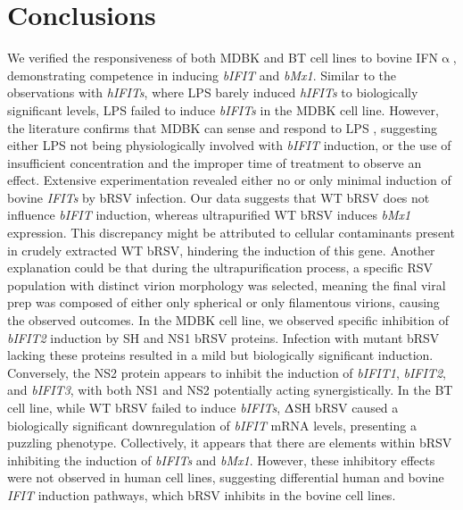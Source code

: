 \section{Conclusions} \label{sec:Conclusions Chapter2}
We verified the responsiveness of both MDBK and BT cell lines to bovine IFN$\upalpha$, demonstrating competence in inducing \textit{bIFIT} and \textit{bMx1}. Similar to the observations with \textit{hIFITs}, where LPS barely induced \textit{hIFITs} to biologically significant levels, LPS failed to induce \textit{bIFITs} in the MDBK cell line. However, the literature confirms that MDBK can sense and respond to LPS \cite{Cui2022ThePathway}, suggesting either LPS not being physiologically involved with \textit{bIFIT} induction, or the use of insufficient concentration and the improper time of treatment to observe an effect. Extensive experimentation revealed either no or only minimal induction of bovine \textit{IFITs} by bRSV infection. Our data suggests that WT bRSV does not influence \textit{bIFIT} induction, whereas ultrapurified WT bRSV induces \textit{bMx1} expression. This discrepancy might be attributed to cellular contaminants present in crudely extracted WT bRSV, hindering the induction of this gene. Another explanation could be that during the ultrapurification process, a specific RSV population with distinct virion morphology was selected, meaning the final viral prep was composed of either only spherical or only filamentous virions, causing the observed outcomes. In the MDBK cell line, we observed specific inhibition of \textit{bIFIT2} induction by SH and NS1 bRSV proteins. Infection with mutant bRSV lacking these proteins resulted in a mild but biologically significant induction. Conversely, the NS2 protein appears to inhibit the induction of \textit{bIFIT1}, \textit{bIFIT2}, and \textit{bIFIT3}, with both NS1 and NS2 potentially acting synergistically. In the BT cell line, while WT bRSV failed to induce \textit{bIFITs}, $\Updelta$SH bRSV caused a biologically significant downregulation of \textit{bIFIT} mRNA levels, presenting a puzzling phenotype. Collectively, it appears that there are elements within bRSV inhibiting the induction of \textit{bIFITs} and \textit{bMx1}. However, these inhibitory effects were not observed in human cell lines, suggesting differential human and bovine \textit{IFIT} induction pathways, which bRSV inhibits in the bovine cell lines.

